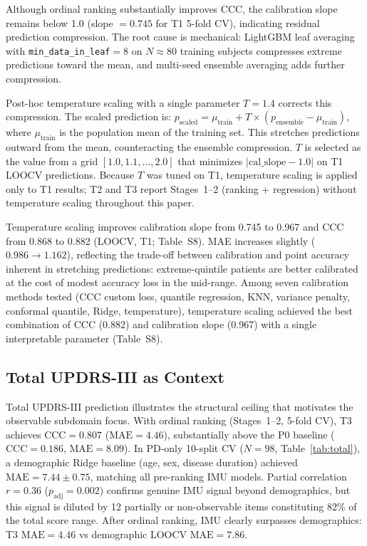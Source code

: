 \documentclass[11pt,a4paper]{article}
\begin{document}
Although ordinal ranking substantially improves CCC, the calibration slope remains below 1.0 (slope $=0.745$ for T1 5-fold CV), indicating residual prediction compression. The root cause is mechanical: LightGBM leaf averaging with \texttt{min\_data\_in\_leaf}$=8$ on $N\approx 80$ training subjects compresses extreme predictions toward the mean, and multi-seed ensemble averaging adds further compression.

Post-hoc temperature scaling with a single parameter $T=1.4$ corrects this compression. The scaled prediction is: $p_{\mathrm{scaled}} = \mu_{\mathrm{train}} + T \times (p_{\mathrm{ensemble}} - \mu_{\mathrm{train}})$, where $\mu_{\mathrm{train}}$ is the population mean of the training set. This stretches predictions outward from the mean, counteracting the ensemble compression. $T$ is selected as the value from a grid $[1.0, 1.1, \ldots, 2.0]$ that minimizes $|\text{cal\_slope} - 1.0|$ on T1 LOOCV predictions. Because $T$ was tuned on T1, temperature scaling is applied only to T1 results; T2 and T3 report Stages~1--2 (ranking + regression) without temperature scaling throughout this paper.

Temperature scaling improves calibration slope from 0.745 to 0.967 and CCC from 0.868 to 0.882 (LOOCV, T1; Table~S8). MAE increases slightly ($0.986 \rightarrow 1.162$), reflecting the trade-off between calibration and point accuracy inherent in stretching predictions: extreme-quintile patients are better calibrated at the cost of modest accuracy loss in the mid-range. Among seven calibration methods tested (CCC custom loss, quantile regression, KNN, variance penalty, conformal quantile, Ridge, temperature), temperature scaling achieved the best combination of CCC (0.882) and calibration slope (0.967) with a single interpretable parameter (Table~S8).

\subsection{Total UPDRS-III as Context}

Total UPDRS-III prediction illustrates the structural ceiling that motivates the observable subdomain focus. With ordinal ranking (Stages~1--2, 5-fold CV), T3 achieves $\mathrm{CCC}=0.807$ ($\mathrm{MAE}=4.46$), substantially above the P0 baseline ($\mathrm{CCC}=0.186$, $\mathrm{MAE}=8.09$). In PD-only 10-split CV ($N=98$, Table~\ref{tab:total}), a demographic Ridge baseline (age, sex, disease duration) achieved $\mathrm{MAE}=7.44\pm0.75$, matching all pre-ranking IMU models. Partial correlation $r=0.36$ ($p_{\mathrm{adj}}=0.002$) confirms genuine IMU signal beyond demographics, but this signal is diluted by 12 partially or non-observable items constituting 82\% of the total score range. After ordinal ranking, IMU clearly surpasses demographics: T3 $\mathrm{MAE}=4.46$ vs demographic LOOCV $\mathrm{MAE}=7.86$.
\end{document}
